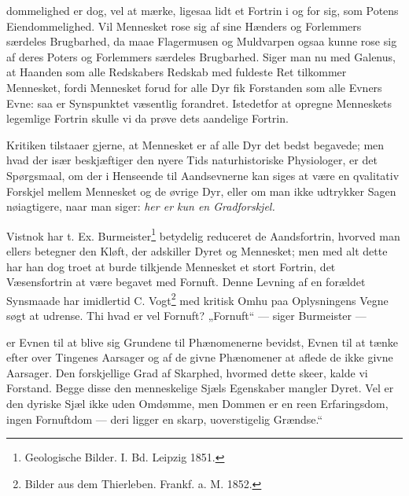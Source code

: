 \documentclass[12pt,a4paper]{book}
\begin{document}

\setcounter{footnote}{0}
dommelighed er dog, vel at mærke, ligesaa lidt et Fortrin i og for sig, som
Potens Eiendommelighed. Vil Mennesket rose sig af sine Hænders og Forlemmers
særdeles Brugbarhed, da maae Flagermusen og Muldvarpen ogsaa kunne rose sig af
deres Poters og Forlemmers særdeles Brugbarhed. Siger man nu med Galenus, at
Haanden som alle Redskabers Redskab med fuldeste Ret tilkommer Mennesket, fordi
Mennesket forud for alle Dyr fik Forstanden som alle Evners Evne: saa er
Synspunktet væsentlig forandret. Istedetfor at opregne Menneskets legemlige
Fortrin skulle vi da prøve dets aandelige Fortrin.

Kritiken tilstaaer gjerne, at Mennesket er af alle Dyr det bedst begavede; men
hvad der især beskjæftiger den nyere Tids naturhistoriske Physiologer, er det
Spørgsmaal, om der i Henseende til Aandsevnerne kan siges at være en qvalitativ
Forskjel mellem Mennesket og de øvrige Dyr, eller om man ikke udtrykker Sagen
nøiagtigere, naar man siger: \emph{her er kun en Gradforskjel.}

Vistnok har t. Ex. Burmeister\footnote{Geologische Bilder. I. Bd. Leipzig
1851.} betydelig reduceret de Aandsfortrin, hvorved man ellers betegner den
Kløft, der adskiller Dyret og Mennesket; men med alt dette har han dog troet at
burde tilkjende Mennesket et stort Fortrin, det Væsensfortrin at være begavet
med Fornuft. Denne Levning af en forældet Synsmaade har imidlertid C.
Vogt\footnote{Bilder aus dem Thierleben. Frankf. a. M. 1852.} med kritisk Omhu
paa Oplysningens Vegne søgt at udrense. Thi hvad er vel Fornuft? „Fornuft“ ---
siger Burmeister ---

er Evnen til at blive sig Grundene til Phænomenerne bevidst, Evnen til at tænke
efter over Tingenes Aarsager og af de givne Phænomener at aflede de ikke givne
Aarsager.
Den forskjellige Grad af Skarphed, hvormed dette skeer, kalde vi Forstand.
Begge disse den menneskelige Sjæls Egenskaber mangler Dyret. Vel er den dyriske
Sjæl ikke uden Omdømme, men Dommen er en reen Erfaringsdom, ingen Fornuftdom
--- deri ligger en skarp, uoverstigelig Grændse.“
\end{document}
